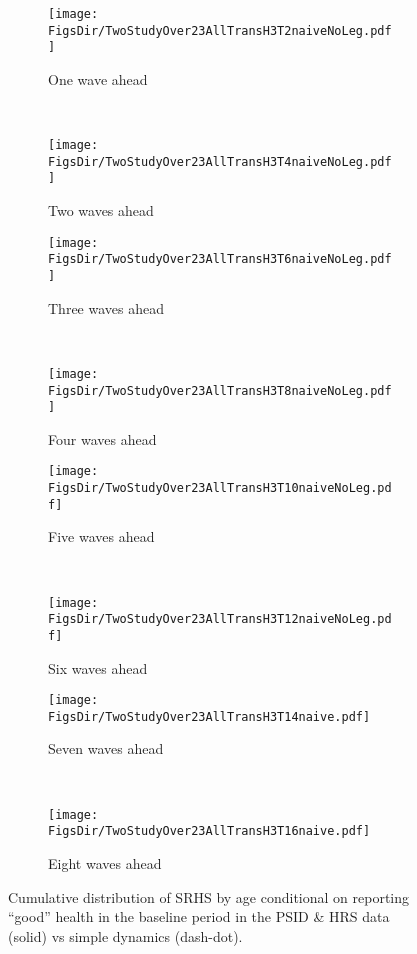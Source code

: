 \documentclass[12pt,pdftex,letterpaper]{article}
\newcommand{\RootDir}{..}
\newcommand{\FigsDir}{\RootDir/Figures}
\begin{document}
\begin{figure}
	\centering
	\begin{subfigure}[b]{0.48\textwidth}
		\texttt{[image: \\FigsDir/TwoStudyOver23AllTransH3T2naiveNoLeg.pdf]}
		\caption{One wave ahead}\label{fig:Naive1AheadGood}
	\end{subfigure}
	~
	\begin{subfigure}[b]{0.48\textwidth}
		\texttt{[image: \\FigsDir/TwoStudyOver23AllTransH3T4naiveNoLeg.pdf]}
		\caption{Two waves ahead}\label{fig:Naive2AheadGood}
	\end{subfigure}
	
	\begin{subfigure}[b]{0.48\textwidth}
		\texttt{[image: \\FigsDir/TwoStudyOver23AllTransH3T6naiveNoLeg.pdf]}
		\caption{Three waves ahead}\label{fig:Naive3AheadGood}
	\end{subfigure}
	~
	\begin{subfigure}[b]{0.48\textwidth}
		\texttt{[image: \\FigsDir/TwoStudyOver23AllTransH3T8naiveNoLeg.pdf]}
		\caption{Four waves ahead}\label{fig:Naive4AheadGood}
	\end{subfigure}
	
	\begin{subfigure}[b]{0.48\textwidth}
		\texttt{[image: \\FigsDir/TwoStudyOver23AllTransH3T10naiveNoLeg.pdf]}
		\caption{Five waves ahead}\label{fig:Naive5AheadGood}
	\end{subfigure}
	~
	\begin{subfigure}[b]{0.48\textwidth}
		\texttt{[image: \\FigsDir/TwoStudyOver23AllTransH3T12naiveNoLeg.pdf]}
		\caption{Six waves ahead}\label{fig:Naive6AheadGood}
	\end{subfigure}
	
	\begin{subfigure}[b]{0.48\textwidth}
		\texttt{[image: \\FigsDir/TwoStudyOver23AllTransH3T14naive.pdf]}
		\caption{Seven waves ahead}\label{fig:Naive7AheadGood}
	\end{subfigure}
	~
	\begin{subfigure}[b]{0.48\textwidth}
		\texttt{[image: \\FigsDir/TwoStudyOver23AllTransH3T16naive.pdf]}
		\caption{Eight waves ahead}\label{fig:Naive8AheadGood}
	\end{subfigure}
	\caption{Cumulative distribution of SRHS by age conditional on reporting ``good'' health in the baseline period in the PSID \& HRS data (solid) vs simple dynamics (dash-dot).}\label{fig:NaiveTransGD}
\end{figure}
\end{document}
